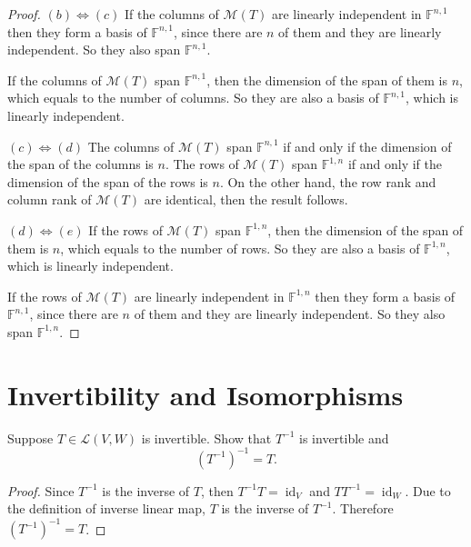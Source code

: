 \begin{proof}
    $(b) \Leftrightarrow (c)$ If the columns of $\mathcal{M}(T)$ are linearly independent in $\mathbb{F}^{n,1}$ then they form a basis of $\mathbb{F}^{n,1}$, since there are $n$ of them and they are linearly independent. So they also span $\mathbb{F}^{n,1}$.

    If the columns of $\mathcal{M}(T)$ span $\mathbb{F}^{n,1}$, then the dimension of the span of them is $n$, which equals to the number of columns. So they are also a basis of $\mathbb{F}^{n,1}$, which is linearly independent.

    $(c) \Leftrightarrow (d)$ The columns of $\mathcal{M}(T)$ span $\mathbb{F}^{n,1}$ if and only if the dimension of the span of the columns is $n$. The rows of $\mathcal{M}(T)$ span $\mathbb{F}^{1,n}$ if and only if the dimension of the span of the rows is $n$. On the other hand, the row rank and column rank of $\mathcal{M}(T)$ are identical, then the result follows.

    $(d) \Leftrightarrow (e)$ If the rows of $\mathcal{M}(T)$ span $\mathbb{F}^{1,n}$, then the dimension of the span of them is $n$, which equals to the number of rows. So they are also a basis of $\mathbb{F}^{1,n}$, which is linearly independent.

    If the rows of $\mathcal{M}(T)$ are linearly independent in $\mathbb{F}^{1,n}$ then they form a basis of $\mathbb{F}^{n,1}$, since there are $n$ of them and they are linearly independent. So they also span $\mathbb{F}^{1,n}$.
\end{proof}
\newpage

\section{Invertibility and Isomorphisms}

\begin{exercise}\label{chapter3:sectionD:exercise1}
    Suppose $T \in \mathcal{L}(V, W)$ is invertible. Show that $T^{-1}$ is invertible and
    \[
        {\left(T^{-1}\right)}^{-1} = T.
    \]
\end{exercise}

\begin{proof}
    Since $T^{-1}$ is the inverse of $T$, then $T^{-1}T = \operatorname{id}_{V}$ and $TT^{-1} = \operatorname{id}_{W}$. Due to the definition of inverse linear map, $T$ is the inverse of $T^{-1}$. Therefore ${\left(T^{-1}\right)}^{-1} = T$.
\end{proof}
\newpage

